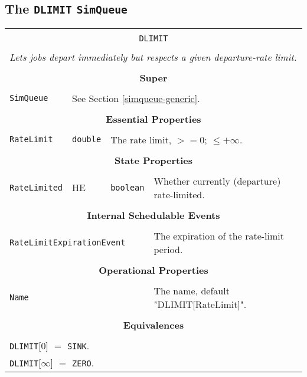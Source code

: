 \documentclass[12pt]{book}
\begin{document}
\subsection{The \lstinline{DLIMIT} \lstinline{SimQueue}}

\begin{tabular}{|l|l|l|l|}
\hline
\multicolumn{4}{|c|}{} \\
\multicolumn{4}{|c|}{\lstinline[basicstyle=\large]{DLIMIT}} \\
\multicolumn{4}{|c|}{} \\
\hline
\multicolumn{4}{|l|}{\em Lets jobs depart immediately but respects a given departure-rate limit.} \\
\hline
\multicolumn{4}{|c|}{} \\
\multicolumn{4}{|c|}{\bf Super} \\
\multicolumn{4}{|c|}{} \\
\hline
\lstinline|SimQueue| & \multicolumn{3}{|l|}{See Section \ref{simqueue-generic}.} \\
\hline
\multicolumn{4}{|c|}{} \\
\multicolumn{4}{|c|}{\bf Essential Properties} \\
\multicolumn{4}{|c|}{} \\
\hline
\lstinline|RateLimit| & \lstinline|double| & \multicolumn{2}{|l|}{The rate limit, $>= 0$; $\leq +\infty$.} \\
\hline
\multicolumn{4}{|c|}{} \\
\multicolumn{4}{|c|}{\bf State Properties} \\
\multicolumn{4}{|c|}{} \\
\hline
\lstinline|RateLimited| & HE & \lstinline|boolean| & Whether currently (departure) rate-limited. \\
\hline
\multicolumn{4}{|c|}{} \\
\multicolumn{4}{|c|}{\bf Internal Schedulable Events} \\
\multicolumn{4}{|c|}{} \\
\hline
\multicolumn{3}{|l|}{\lstinline|RateLimitExpirationEvent|} & The expiration of the rate-limit period. \\
\hline
\multicolumn{4}{|c|}{} \\
\multicolumn{4}{|c|}{\bf Operational Properties} \\
\multicolumn{4}{|c|}{} \\
\hline
\multicolumn{3}{|l|}{\lstinline|Name|} & The name, default "DLIMIT[RateLimit]". \\
\hline
\multicolumn{4}{|c|}{} \\
\multicolumn{4}{|c|}{\bf Equivalences} \\
\multicolumn{4}{|c|}{} \\
\hline
\multicolumn{4}{|l|}{\lstinline|DLIMIT|[$0$] $=$ \lstinline|SINK|.} \\
\multicolumn{4}{|l|}{\lstinline|DLIMIT|[$\infty$] $=$ \lstinline|ZERO|.} \\
\hline
\end{tabular}
\end{document}

